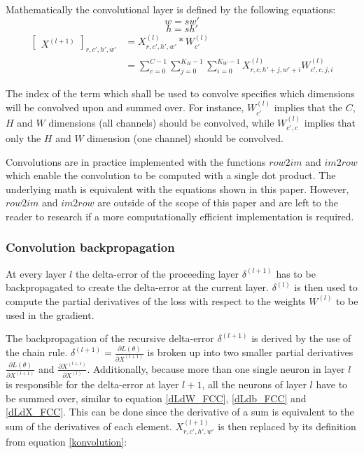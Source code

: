 \documentclass[a4paper,11pt,twoside]{article}
\newcommand*{\inpd}[2]{\ensuremath{\frac{\partial #1}{\partial #2}}}
\begin{document}
Mathematically the convolutional layer is defined by the following equations: \cite{cs231n} \cite{convmath}
\begin{equation}
w = sw'
\end{equation}
\begin{equation}
h = sh'
\end{equation}
\begin{equation}\label{konvolution}
\begin{split}
	\begin{bmatrix} X^{(l+1)} \end{bmatrix}_{r, c', h', w'}	
		& = X^{(l)}_{r, c', h', w'} *W^{(l)}_{c'} \\
		& = \sum^{C-1}_{c=0} \sum^{K_H-1}_{j=0} \sum^{K_W-1}_{i=0} X^{(l)}_{r, c, h'+j, w'+i}W^{(l)}_{c', c, j, i}
\end{split}
\end{equation}

The index of the term which shall be used to convolve specifies which dimensions will be convolved upon and summed over. For instance, $W^{(l)}_{c'}$ implies that the $C$, $H$ and $W$ dimensions (all channels) should be convolved, while $W^{(l)}_{c', c}$ implies that only the $H$ and $W$ dimension (one channel) should be convolved.

Convolutions are in practice implemented with the functions $row2im$ and $im2row$ which enable the convolution to be computed with a single dot product. The underlying math is equivalent with the equations shown in this paper. However, $row2im$ and $im2row$ are outside of the scope of this paper and are left to the reader to research if a more computationally efficient implementation is required. \cite{cs231n} \cite{convmath} \cite{convarithmetic}

\subsubsection{Convolution backpropagation}
At every layer $l$ the delta-error of the proceeding layer $\delta^{(l+1)}$ has to be backpropagated to create the delta-error at the current layer. $\delta^{(l)}$ is then used to compute the partial derivatives of the loss with respect to the weights $W^{(l)}$ to be used in the gradient. \cite{cs231n} \cite{convmath}

The backpropagation of the recursive delta-error $\delta^{(l+1)}$ is derived by the use of the chain rule. $\delta^{(l+1)} = \inpd{L(\theta)}{X^{(l+1)}}$ is broken up into two smaller partial derivatives $\inpd{L(\theta)}{X^{(l+1)}}$ and $\inpd{X^{(l+1)}}{X^{(l)}}$. Additionally, because more than one single neuron in layer $l$ is responsible for the delta-error at layer $l+1$, all the neurons of layer $l$ have to be summed over, similar to equation \eqref{dLdW_FCC}, \eqref{dLdb_FCC} and \eqref{dLdX_FCC}. This can be done since the derivative of a sum is equivalent to the sum of the derivatives of each element. $X^{(l+1)}_{r,c',h',w'}$ is then replaced by its definition from equation \eqref{konvolution}: \cite{convmath} \cite{webconv1} \cite{webconv2} \cite{webconv3}
\end{document}
